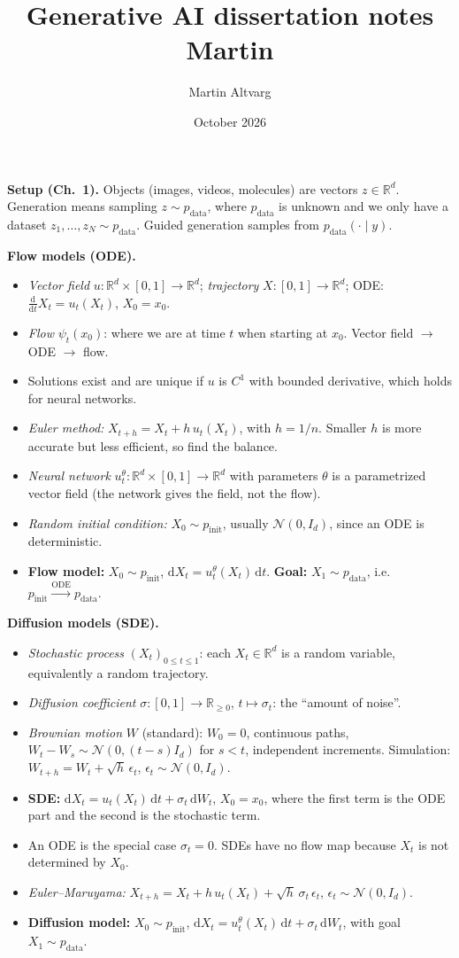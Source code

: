 \documentclass{article}
\title{{Generative AI dissertation notes Martin}}
\author{Martin Altvarg}
\date{October 2026}
\newcommand{\R}{\mathbb{R}}
\newcommand{\pinit}{p_{\mathrm{init}}}
\newcommand{\pdata}{p_{\mathrm{data}}}
\newcommand{\Id}{I_d}
\newcommand{\uth}{u_t^{\theta}}
\newcommand{\dd}{\mathrm{d}}
\newcommand{\Normal}{\mathcal{N}}
\begin{document}
\maketitle

\textbf{Setup (Ch.\ 1).} Objects (images, videos, molecules) are vectors $z\in\R^d$. Generation means sampling $z\sim\pdata$, where $\pdata$ is unknown and we only have a dataset $z_1,\dots,z_N\sim\pdata$. Guided generation samples from $\pdata(\cdot\mid y)$.
 
\textbf{Flow models (ODE).}
\begin{itemize}
  \item \emph{Vector field} $u:\R^d\times[0,1]\to\R^d$; \emph{trajectory} $X:[0,1]\to\R^d$; ODE: $\frac{\dd}{\dd t}X_t=u_t(X_t)$, $X_0=x_0$.
  \item \emph{Flow} $\psi_t(x_0)$: where we are at time $t$ when starting at $x_0$. Vector field $\to$ ODE $\to$ flow.
  \item Solutions exist and are unique if $u$ is $C^1$ with bounded derivative, which holds for neural networks.
  \item \emph{Euler method:} $X_{t+h}=X_t+h\,u_t(X_t)$, with $h=1/n$. Smaller $h$ is more accurate but less efficient, so find the balance.
  \item \emph{Neural network} $\uth:\R^d\times[0,1]\to\R^d$ with parameters $\theta$ is a parametrized vector field (the network gives the field, not the flow).
  \item \emph{Random initial condition:} $X_0\sim\pinit$, usually $\Normal(0,\Id)$, since an ODE is deterministic.
  \item \textbf{Flow model:} $X_0\sim\pinit$, $\dd X_t=\uth(X_t)\,\dd t$. \textbf{Goal:} $X_1\sim\pdata$, i.e.\ $\pinit\xrightarrow{\text{ODE}}\pdata$.
\end{itemize}
 
\textbf{Diffusion models (SDE).}
\begin{itemize}
  \item \emph{Stochastic process} $(X_t)_{0\le t\le 1}$: each $X_t\in\R^d$ is a random variable, equivalently a random trajectory.
  \item \emph{Diffusion coefficient} $\sigma:[0,1]\to\R_{\ge0}$, $t\mapsto\sigma_t$: the ``amount of noise''.
  \item \emph{Brownian motion} $W$ (standard): $W_0=0$, continuous paths, $W_t-W_s\sim\Normal(0,(t-s)\Id)$ for $s<t$, independent increments. Simulation: $W_{t+h}=W_t+\sqrt h\,\epsilon_t$, $\epsilon_t\sim\Normal(0,\Id)$.
  \item \textbf{SDE:} $\dd X_t=u_t(X_t)\,\dd t+\sigma_t\,\dd W_t$, $X_0=x_0$, where the first term is the ODE part and the second is the stochastic term.
  \item An ODE is the special case $\sigma_t=0$. SDEs have no flow map because $X_t$ is not determined by $X_0$.
  \item \emph{Euler--Maruyama:} $X_{t+h}=X_t+h\,u_t(X_t)+\sqrt h\,\sigma_t\,\epsilon_t$, $\epsilon_t\sim\Normal(0,\Id)$.
  \item \textbf{Diffusion model:} $X_0\sim\pinit$, $\dd X_t=\uth(X_t)\,\dd t+\sigma_t\,\dd W_t$, with goal $X_1\sim\pdata$.
\end{itemize}
 
\end{document}
